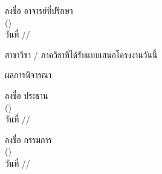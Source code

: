 \documentclass[12pt,a4paper]{article}
\newcommand{\textlight}[1]{{\thailightfont #1}}
\newcommand{\dotrule}[1]{\hdashrule{#1}{0.6pt}{1pt}}
\begin{document}
\dotrule{500pt}

\vspace{0.5cm}

\hfill\begin{minipage}{10cm}
    \vspace{0.5cm}
    \begin{center}
        \textlight{ลงชื่อ \dotrule{150pt} อาจารย์ที่ปรึกษา}\\[0.2cm]
        \textlight{(\dotrule{180pt})}\\[0.4cm]
        \textlight{วันที่ \dotrule{50pt}/\dotrule{50pt}/\dotrule{50pt}}
    \end{center}
    \vspace{0.5cm}
\end{minipage}                          

\vspace{13cm}

\textlight{สาขาวิชา / ภาควิชาที่ได้รับแบบเสนอโครงงานวันนี้ \dotrule{260pt}}

\textlight{ผลการพิจารณา}
\dotrule{422pt}

\dotrule{500pt}

\dotrule{500pt}

\vspace{2cm}

\hfill\begin{minipage}{8cm}
    \vspace{0.5cm}
    \begin{center}
        \textlight{ลงชื่อ \dotrule{150pt} ประธาน}\\[0.2cm]
        \textlight{(\dotrule{180pt})}\\[0.4cm]
        \textlight{วันที่ \dotrule{50pt}/\dotrule{50pt}/\dotrule{50pt}}
    \end{center}
    \vspace{0.5cm}
\end{minipage}  

\hfill\begin{minipage}{8cm}
    \vspace{0.5cm}
    \begin{center}
        \textlight{ลงชื่อ \dotrule{150pt} กรรมการ}\\[0.2cm]
        \textlight{(\dotrule{180pt})}\\[0.4cm]
        \textlight{วันที่ \dotrule{50pt}/\dotrule{50pt}/\dotrule{50pt}}
    \end{center}
    \vspace{0.5cm}
\end{minipage}
\end{document}
